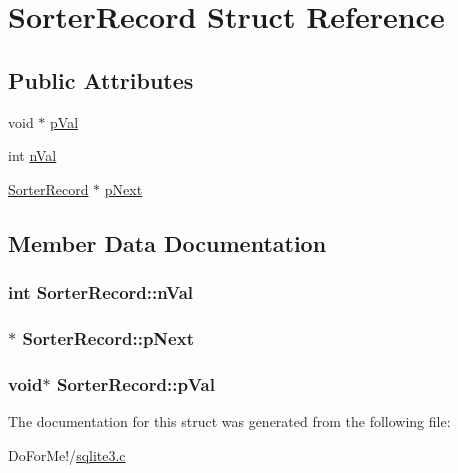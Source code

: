 \hypertarget{struct_sorter_record}{\section{Sorter\-Record Struct Reference}
\label{struct_sorter_record}
}
\subsection*{Public Attributes}
\begin{DoxyCompactItemize}
\item 
void $\ast$ \hyperlink{struct_sorter_record_af59daa686859ca44f7f0be92b3f0d133}{p\-Val}
\item 
int \hyperlink{struct_sorter_record_a2b8ffc0f8410826de8b41425759bf462}{n\-Val}
\item 
\hyperlink{struct_sorter_record}{Sorter\-Record} $\ast$ \hyperlink{struct_sorter_record_a08fdaa8302834166f6a8d12e09c95b58}{p\-Next}
\end{DoxyCompactItemize}


\subsection{Member Data Documentation}
\hypertarget{struct_sorter_record_a2b8ffc0f8410826de8b41425759bf462}{
\subsubsection[{n\-Val}]{\setlength{\rightskip}{0pt plus 5cm}int Sorter\-Record\-::n\-Val}}\label{struct_sorter_record_a2b8ffc0f8410826de8b41425759bf462}
\hypertarget{struct_sorter_record_a08fdaa8302834166f6a8d12e09c95b58}{
\subsubsection[{p\-Next}]{$\ast$ Sorter\-Record\-::p\-Next}}\label{struct_sorter_record_a08fdaa8302834166f6a8d12e09c95b58}
\hypertarget{struct_sorter_record_af59daa686859ca44f7f0be92b3f0d133}{
\subsubsection[{p\-Val}]{\setlength{\rightskip}{0pt plus 5cm}void$\ast$ Sorter\-Record\-::p\-Val}}\label{struct_sorter_record_af59daa686859ca44f7f0be92b3f0d133}


The documentation for this struct was generated from the following file\-:\begin{DoxyCompactItemize}
\item 
Do\-For\-Me!/\hyperlink{sqlite3_8c}{sqlite3.\-c}\end{DoxyCompactItemize}
